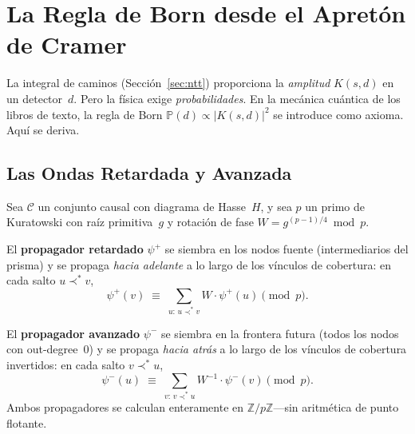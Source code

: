 \documentclass[11pt, a4paper, openany]{book}
\newcommand{\covers}{\prec^{\!*}}
\begin{document}
\section{La Regla de Born desde el Apret\'on de Cramer}
\label{sec:born-rule}

La integral de caminos (Secci\'on~\ref{sec:ntt}) proporciona la
\emph{amplitud} $K(s,d)$ en un detector~$d$. Pero la f\'isica exige
\emph{probabilidades}. En la mec\'anica cu\'antica de los libros de
texto, la regla de Born $\mathbb{P}(d) \propto |K(s,d)|^2$ se
introduce como axioma. Aqu\'i se deriva.

\subsection{Las Ondas Retardada y Avanzada}

\begin{definition}
\label{def:retarded-advanced}
Sea $\mathcal{C}$ un conjunto causal con diagrama de Hasse~$H$, y sea
$p$ un primo de Kuratowski con ra\'iz primitiva~$g$ y rotaci\'on de
fase $W = g^{(p-1)/4} \bmod p$.

El \textbf{propagador retardado} $\psi^{+}$ se siembra en los nodos
fuente (intermediarios del prisma) y se propaga \emph{hacia adelante}
a lo largo de los v\'inculos de cobertura: en cada salto
$u \covers v$,
\[
  \psi^{+}(v) \;\equiv\; \sum_{u :\, u \covers v}
  W \cdot \psi^{+}(u) \pmod{p}.
\]

El \textbf{propagador avanzado} $\psi^{-}$ se siembra en la frontera
futura (todos los nodos con out-degree~$0$) y se propaga \emph{hacia
atr\'as} a lo largo de los v\'inculos de cobertura invertidos: en cada
salto $v \covers u$,
\[
  \psi^{-}(u) \;\equiv\; \sum_{v :\, v \covers u}
  W^{-1} \cdot \psi^{-}(v) \pmod{p}.
\]
Ambos propagadores se calculan enteramente en
$\mathbb{Z}/p\mathbb{Z}$---sin aritm\'etica de punto flotante.
\end{definition}
\end{document}

